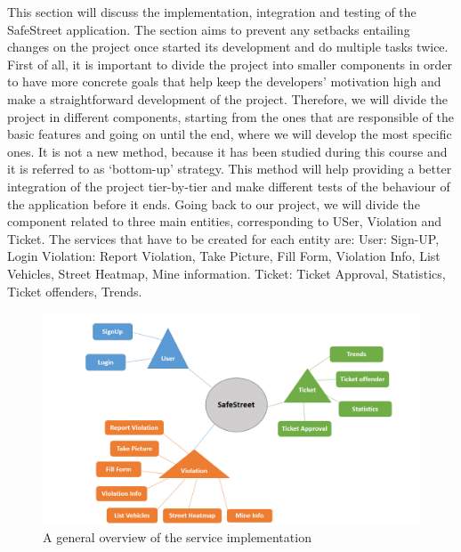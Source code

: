This section will discuss the implementation, integration and testing of the SafeStreet application. The section aims to prevent any setbacks entailing changes on the project once started its development and do multiple tasks twice. First of all, it is important to divide the project into smaller components in order to have more concrete goals that help keep the developers’ motivation high and make a straightforward development of the project. Therefore, we will divide the project in diﬀerent components, starting from the ones that are responsible of the basic features and going on until the end, where we will develop the most speciﬁc ones. It is not a new method, because it has been studied during this course and it is referred to as ‘bottom-up’ strategy. This method will help providing a better integration of the project tier-by-tier and make diﬀerent tests of the behaviour of the application before it ends. Going back to our project, we will divide the component related to three main entities, corresponding to USer, Violation and Ticket.
The services that have to be created for each entity are:
User: Sign-UP, Login
Violation: Report Violation, Take Picture, Fill Form, Violation Info, List Vehicles, Street Heatmap, Mine information.
Ticket: Ticket Approval, Statistics, Ticket offenders, Trends.

\begin{figure}
\centering
\includegraphics[width=\textwidth]{Images/ImplemetationandTest.png}
\caption{\label{fig:Test} A general overview of the service implementation}
\end{figure}

